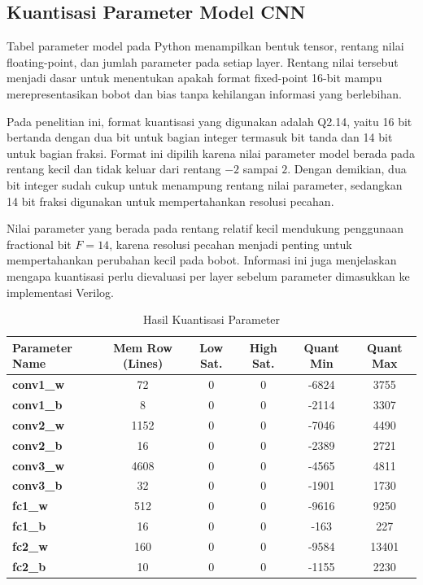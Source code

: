 	\subsection{Kuantisasi Parameter Model CNN}

Tabel parameter model pada Python menampilkan bentuk tensor, rentang nilai floating-point, dan jumlah parameter pada setiap layer. Rentang nilai tersebut menjadi dasar untuk menentukan apakah format fixed-point 16-bit mampu merepresentasikan bobot dan bias tanpa kehilangan informasi yang berlebihan.

Pada penelitian ini, format kuantisasi yang digunakan adalah Q2.14, yaitu 16 bit bertanda dengan dua bit untuk bagian integer termasuk bit tanda dan 14 bit untuk bagian fraksi. Format ini dipilih karena nilai parameter model berada pada rentang kecil dan tidak keluar dari rentang $-2$ sampai $2$. Dengan demikian, dua bit integer sudah cukup untuk menampung rentang nilai parameter, sedangkan 14 bit fraksi digunakan untuk mempertahankan resolusi pecahan.

Nilai parameter yang berada pada rentang relatif kecil mendukung penggunaan fractional bit $F=14$, karena resolusi pecahan menjadi penting untuk mempertahankan perubahan kecil pada bobot. Informasi ini juga menjelaskan mengapa kuantisasi perlu dievaluasi per layer sebelum parameter dimasukkan ke implementasi Verilog.
	\begin{table}[htbp]
	\centering
		\caption{Hasil Kuantisasi Parameter}
		\vspace{2mm}
		\label{table:hasil-kuntitasi}
		\small
		\begin{tabular}{lccccc}
			\toprule
			\textbf{Parameter Name} & \textbf{Mem Row (Lines)} & \textbf{Low Sat.} & \textbf{High Sat.} & \textbf{Quant Min} & \textbf{Quant Max} \\
			\midrule
			\textbf{conv1\_w} & 72   & 0 & 0 & -6824 & 3755  \\
			\textbf{conv1\_b} & 8    & 0 & 0 & -2114 & 3307  \\
			\textbf{conv2\_w} & 1152 & 0 & 0 & -7046 & 4490  \\
			\textbf{conv2\_b} & 16   & 0 & 0 & -2389 & 2721  \\
			\textbf{conv3\_w} & 4608 & 0 & 0 & -4565 & 4811  \\
			\textbf{conv3\_b} & 32   & 0 & 0 & -1901 & 1730  \\
			\textbf{fc1\_w}   & 512  & 0 & 0 & -9616 & 9250  \\
			\textbf{fc1\_b}   & 16   & 0 & 0 & -163  & 227   \\
			\textbf{fc2\_w}   & 160  & 0 & 0 & -9584 & 13401 \\
			\textbf{fc2\_b}   & 10   & 0 & 0 & -1155 & 2230  \\
			\bottomrule
		\end{tabular}
	\end{table}

